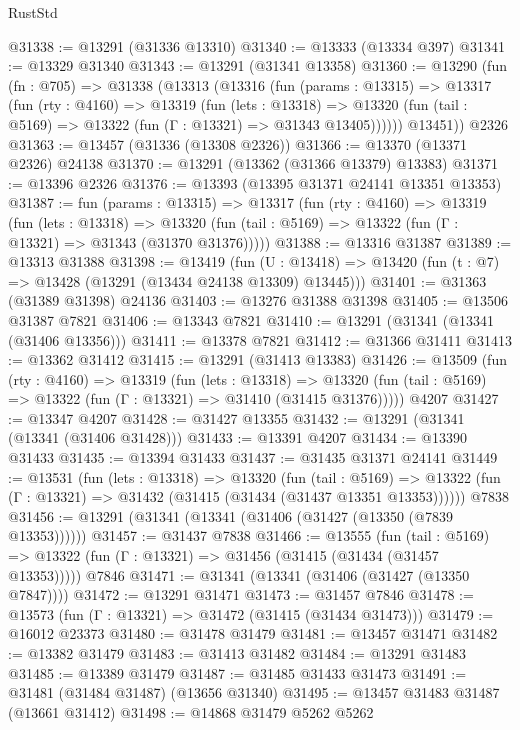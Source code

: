 \begin{lexlean}{RustStd}
\begin{coremodule}
@31338 := @13291 (@31336 @13310)
@31340 := @13333 (@13334 @397)
@31341 := @13329 @31340
@31343 := @13291 (@31341 @13358)
@31360 := @13290
    (fun (fn : @705) =>
    @31338
      (@13313
        (@13316
          (fun (params : @13315) =>
          @13317
            (fun (rty : @4160) =>
            @13319
              (fun (lets : @13318) =>
              @13320 (fun (tail : @5169) => @13322 (fun (Γ : @13321) => @31343 @13405))))))
        @13451))
    @2326
@31363 := @13457 (@31336 (@13308 @2326))
@31366 := @13370 (@13371 @2326) @24138
@31370 := @13291 (@13362 (@31366 @13379) @13383)
@31371 := @13396 @2326
@31376 := @13393 (@13395 @31371 @24141 @13351 @13353)
@31387 := fun (params : @13315) =>
  @13317
    (fun (rty : @4160) =>
    @13319
      (fun (lets : @13318) =>
      @13320 (fun (tail : @5169) => @13322 (fun (Γ : @13321) => @31343 (@31370 @31376)))))
@31388 := @13316 @31387
@31389 := @13313 @31388
@31398 := @13419
    (fun (U : @13418) => @13420 (fun (t : @7) => @13428 (@13291 (@13434 @24138 @13309) @13445)))
@31401 := @31363 (@31389 @31398) @24136
@31403 := @13276 @31388 @31398
@31405 := @13506 @31387 @7821
@31406 := @13343 @7821
@31410 := @13291 (@31341 (@13341 (@31406 @13356)))
@31411 := @13378 @7821
@31412 := @31366 @31411
@31413 := @13362 @31412
@31415 := @13291 (@31413 @13383)
@31426 := @13509
    (fun (rty : @4160) =>
    @13319
      (fun (lets : @13318) =>
      @13320 (fun (tail : @5169) => @13322 (fun (Γ : @13321) => @31410 (@31415 @31376)))))
    @4207
@31427 := @13347 @4207
@31428 := @31427 @13355
@31432 := @13291 (@31341 (@13341 (@31406 @31428)))
@31433 := @13391 @4207
@31434 := @13390 @31433
@31435 := @13394 @31433
@31437 := @31435 @31371 @24141
@31449 := @13531
    (fun (lets : @13318) =>
    @13320
      (fun (tail : @5169) =>
      @13322 (fun (Γ : @13321) => @31432 (@31415 (@31434 (@31437 @13351 @13353))))))
    @7838
@31456 := @13291 (@31341 (@13341 (@31406 (@31427 (@13350 (@7839 @13353))))))
@31457 := @31437 @7838
@31466 := @13555
    (fun (tail : @5169) => @13322 (fun (Γ : @13321) => @31456 (@31415 (@31434 (@31457 @13353)))))
    @7846
@31471 := @31341 (@13341 (@31406 (@31427 (@13350 @7847))))
@31472 := @13291 @31471
@31473 := @31457 @7846
@31478 := @13573 (fun (Γ : @13321) => @31472 (@31415 (@31434 @31473)))
@31479 := @16012 @23373
@31480 := @31478 @31479
@31481 := @13457 @31471
@31482 := @13382 @31479
@31483 := @31413 @31482
@31484 := @13291 @31483
@31485 := @13389 @31479
@31487 := @31485 @31433 @31473
@31491 := @31481 (@31484 @31487) (@13656 @31340)
@31495 := @13457 @31483 @31487 (@13661 @31412)
@31498 := @14868 @31479 @5262 @5262

\end{coremodule}
\end{lexlean}
